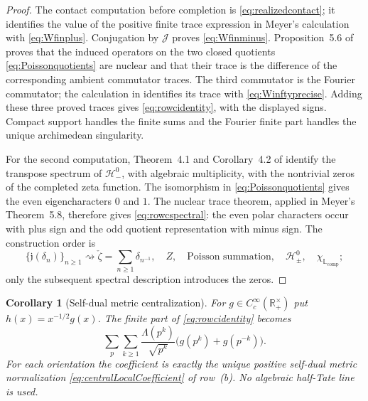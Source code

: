 \documentclass[11pt]{amsart}
\newtheorem{corollary}[theorem]{Corollary}
\theoremstyle{definition}
\theoremstyle{remark}
\newcommand{\R}{\mathbb R}
\begin{document}
\begin{proof}
The contact computation before completion is
\eqref{eq:realizedcontact}; it identifies the value of the positive finite
trace expression in Meyer's calculation with \eqref{eq:Wfinplus}.
Conjugation by
$\mathscr J$ proves \eqref{eq:Wfinminus}.  Proposition~5.6 of
\cite{MeyerZeta} proves that the induced operators on the two closed
quotients \eqref{eq:Poissonquotients} are nuclear and that their trace is
the difference of the corresponding ambient commutator traces.  The third
commutator is the Fourier commutator; the calculation in
\cite[Theorem~5.8 and its proof]{MeyerZeta} identifies its trace with
\eqref{eq:Winftyprecise}.  Adding these three proved traces gives
\eqref{eq:rowcidentity}, with the displayed signs.  Compact support handles
the finite sums and the Fourier finite part handles the unique
archimedean singularity.

For the second computation, Theorem~4.1 and Corollary~4.2 of
\cite{MeyerZeta} identify the transpose spectrum of $\mathcal H_-^0$, with
algebraic multiplicity, with the nontrivial zeros of the completed zeta
function.  The isomorphism in \eqref{eq:Poissonquotients} gives the even
eigencharacters $0$ and $1$.  The nuclear trace theorem, applied in
Meyer's Theorem~5.8, therefore gives \eqref{eq:rowcspectral}: the even polar
characters occur with plus sign and the odd quotient representation with
minus sign.  The construction order is
\[
 \{\mathfrak j(\delta_n)\}_{n\geq1}
 \rightsquigarrow\check\zeta=\sum_{n\geq1}\delta_{n^{-1}},\quad
 Z,\quad \text{Poisson summation},\quad
 \mathcal H_\pm^0,\quad\chi_{\mathbb L_{\mathrm{comp}}};
\]
only the subsequent spectral description introduces the zeros.
\end{proof}

\begin{corollary}[Self-dual metric centralization]
\label{cor:rowccentral}
For $g\in C_c^\infty(\R_+^\times)$ put $h(x)=x^{-1/2}g(x)$.  The finite
part of \eqref{eq:rowcidentity} becomes
\[
 \sum_p\sum_{k\geq1}\frac{\Lambda(p^k)}{\sqrt{p^k}}
 \bigl(g(p^k)+g(p^{-k})\bigr).
\]
For each orientation the coefficient is exactly the unique positive
self-dual metric normalization \eqref{eq:centralLocalCoefficient} of
row~(b).  No algebraic half-Tate line is used.
\end{corollary}
\end{document}

